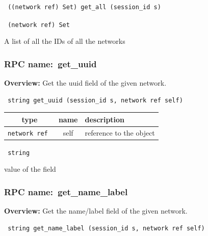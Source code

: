 \begin{verbatim} ((network ref) Set) get_all (session_id s)\end{verbatim}


\vspace{0.3cm}

{\tt 
(network ref) Set
}


A list of all the IDs of all the networks
\vspace{0.3cm}
\vspace{0.3cm}
\vspace{0.3cm}
\subsubsection{RPC name:~get\_uuid}

{\bf Overview:} 
Get the uuid field of the given network.

\begin{verbatim} string get_uuid (session_id s, network ref self)\end{verbatim}



 
\vspace{0.3cm}
\begin{tabular}{|c|c|p{7cm}|}
 \hline
{\bf type} & {\bf name} & {\bf description} \\ \hline
{\tt network ref } & self & reference to the object \\ \hline 

\end{tabular}

\vspace{0.3cm}

{\tt 
string
}


value of the field
\vspace{0.3cm}
\vspace{0.3cm}
\vspace{0.3cm}
\subsubsection{RPC name:~get\_name\_label}

{\bf Overview:} 
Get the name/label field of the given network.

\begin{verbatim} string get_name_label (session_id s, network ref self)\end{verbatim}


